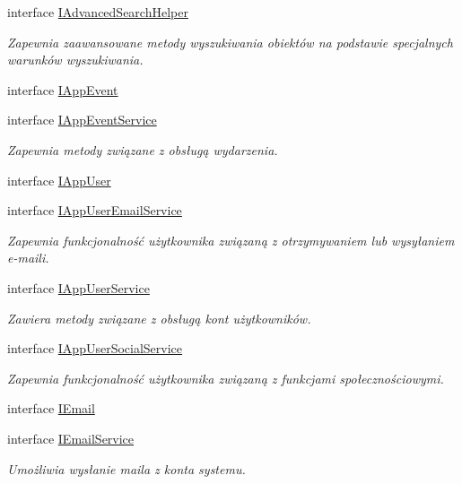 \begin{DoxyCompactItemize}
\item 
interface \hyperlink{interface_contract_1_1_i_advanced_search_helper}{I\+Advanced\+Search\+Helper}
\begin{DoxyCompactList}\small\item\em Zapewnia zaawansowane metody wyszukiwania obiektów na podstawie specjalnych warunków wyszukiwania. \end{DoxyCompactList}\item 
interface \hyperlink{interface_contract_1_1_i_app_event}{I\+App\+Event}
\item 
interface \hyperlink{interface_contract_1_1_i_app_event_service}{I\+App\+Event\+Service}
\begin{DoxyCompactList}\small\item\em Zapewnia metody związane z obsługą wydarzenia. \end{DoxyCompactList}\item 
interface \hyperlink{interface_contract_1_1_i_app_user}{I\+App\+User}
\item 
interface \hyperlink{interface_contract_1_1_i_app_user_email_service}{I\+App\+User\+Email\+Service}
\begin{DoxyCompactList}\small\item\em Zapewnia funkcjonalność użytkownika związaną z otrzymywaniem lub wysyłaniem e-\/maili. \end{DoxyCompactList}\item 
interface \hyperlink{interface_contract_1_1_i_app_user_service}{I\+App\+User\+Service}
\begin{DoxyCompactList}\small\item\em Zawiera metody związane z obsługą kont użytkowników. \end{DoxyCompactList}\item 
interface \hyperlink{interface_contract_1_1_i_app_user_social_service}{I\+App\+User\+Social\+Service}
\begin{DoxyCompactList}\small\item\em Zapewnia funkcjonalność użytkownika związaną z funkcjami społecznościowymi. \end{DoxyCompactList}\item 
interface \hyperlink{interface_contract_1_1_i_email}{I\+Email}
\item 
interface \hyperlink{interface_contract_1_1_i_email_service}{I\+Email\+Service}
\begin{DoxyCompactList}\small\item\em Umożliwia wysłanie maila z konta systemu. \end{DoxyCompactList}\item 

\end{DoxyCompactItemize}

